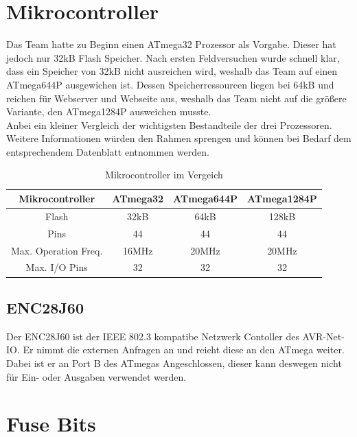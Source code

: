 \section{Mikrocontroller}
Das Team hatte zu Beginn einen ATmega32 Prozessor als Vorgabe. Dieser hat jedoch nur 32kB Flash Speicher. Nach ersten 
Feldversuchen wurde schnell klar, dass ein Speicher von 32kB nicht ausreichen wird, weshalb das Team auf einen ATmega644P 
ausgewichen ist. Dessen Speicherressourcen liegen bei 64kB und reichen für Webserver und Webseite aus, weshalb das Team 
nicht auf die größere Variante, den ATmega1284P ausweichen musste.\\ 
Anbei ein kleiner Vergleich der wichtigsten Bestandteile der 
drei Prozessoren. Weitere Informationen würden den Rahmen sprengen und können
bei Bedarf dem entsprechendem Datenblatt entnommen werden.

\begin{table}[H]
\begin{tabular}{|c|c|c|c|} \hline 
  Mikrocontroller & ATmega32 & ATmega644P & ATmega1284P \\ \hline 
  Flash & 32kB & 64kB & 128kB \\ \hline
  Pins & 44 & 44 & 44 \\ \hline
  Max. Operation Freq. & 16MHz & 20MHz & 20MHz\\ \hline
  Max. I/O Pins & 32 & 32 & 32 \\ \hline
\end{tabular}
\caption{Mikrocontroller im Vergeich}
\label{mikrocontroller}
\end{table}

\subsection{ENC28J60}

Der ENC28J60 ist der IEEE 802.3 kompatibe Netzwerk Contoller des AVR-Net-IO. Er
nimmt die externen Anfragen an und reicht diese an den ATmega weiter. Dabei ist
er an Port B des ATmegas Angeschlossen, dieser kann deswegen nicht für Ein- oder
Ausgaben verwendet werden.

\newpage
\section{Fuse Bits}
\label{chap:Fuse}

